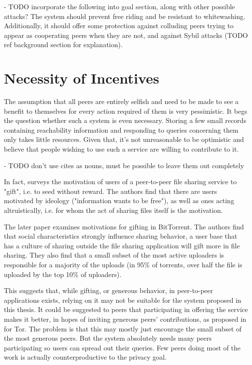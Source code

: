 - TODO incorporate the following into goal section, along with other possible
  attacks?
The system should prevent free riding and be resistant to whitewashing.
Additionally, it should offer some protection against colluding peers trying to
appear as cooperating peers when they are not, and against Sybil attacks (TODO
ref background section for explanation).

\section{Necessity of Incentives}
The assumption that all peers are entirely selfish and need to be made to see a
benefit to themselves for every action required of them is very pessimistic. It
begs the question whether such a system is even necessary. Storing a few small
records containing reachability information and responding to queries concerning
them only takes little resources. Given that, it's not unreasonable to be
optimistic and believe that people wishing to use such a service are willing to
contribute to it.

- TODO don't use cites as nouns, must be possible to leave them out completely

In fact, \cite{mcgee2004gifting} surveys the motivation of users of a
peer-to-peer file sharing service to "gift", i.e. to seed without reward. The
authors find that there are users motivated by ideology ("information wants to
be free"), as well as ones acting altruistically, i.e. for whom the act of
sharing files itself is the motivation.

The later paper \cite{ripeanu2006gifting} examines motivations for gifting in
BitTorrent. The authors find that social characteristics strongly influence
sharing behavior, a user base that has a culture of sharing outside the file
sharing application will gift more in file sharing. They also find that a small
subset of the most active uploaders is responsible for a majority of the uploads
(in 95\% of torrents, over half the file is uploaded by the top 10\% of
uploaders).

This suggests that, while gifting, or generous behavior, in peer-to-peer
applications exists, relying on it may not be suitable for the system proposed
in this thesis. It could be suggested to peers that participating in offering
the service makes it better, in hopes of inviting generous peers' contributions,
as proposed in \cite{arma2009incentive_tor} for Tor. The problem is that this
may mostly just encourage the small subset of the most generous peers. But the
system absolutely needs many peers participating so users can spread out their
queries. Few peers doing most of the work is actually counterproductive to the
privacy goal.

